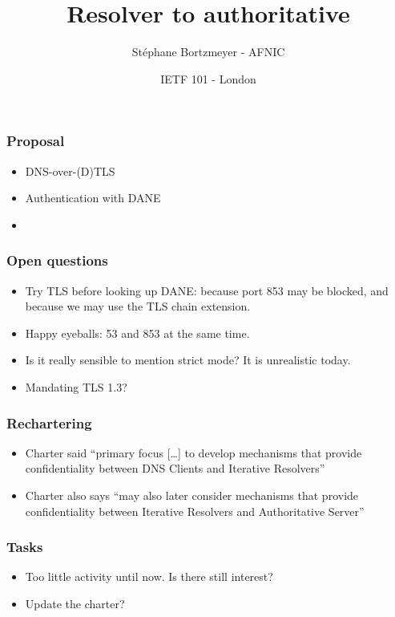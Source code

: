 \documentclass[ignorenonframetext]{beamer}
\title{Resolver to authoritative}
\author{Stéphane Bortzmeyer - AFNIC}
\date{IETF 101 - London}
\begin{document}
\begin{frame}
\maketitle  
\end{frame}

\begin{frame}
  \frametitle{Proposal}
  \begin{itemize}
  \item<2->DNS-over-(D)TLS
  \item<3->Authentication with DANE
  \item<4->  
  \end{itemize}
\end{frame}

\begin{frame}
  \frametitle{Open questions}
  \begin{itemize}
  \item<2->Try TLS before looking up DANE: because port 853 may be
    blocked, and because we may use the TLS chain extension.
  \item<3->Happy eyeballs: 53 and 853 at the same time.  
  \item<4->Is it really sensible to mention strict mode? It is
    unrealistic today.
  \item<5->Mandating TLS 1.3?  
  \end{itemize}
\end{frame}

\begin{frame}
  \frametitle{Rechartering}
  \begin{itemize}
  \item<2->Charter said ``primary focus [\ldots] to develop mechanisms that
    provide confidentiality between DNS Clients and Iterative Resolvers''
  \item<3->Charter also says ``may also later consider mechanisms that provide confidentiality
between Iterative Resolvers and Authoritative Server''
  \end{itemize}
\end{frame}

\begin{frame}
  \frametitle{Tasks}
  \begin{itemize}
  \item<2->Too little activity until now. Is there still interest?
  \item<3->Update the charter?
  \end{itemize}
\end{frame}
\end{document}
